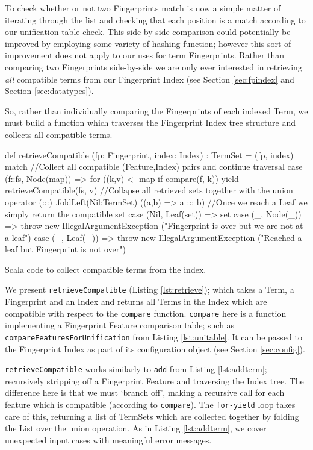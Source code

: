 To check whether or not two Fingerprints match is now a simple matter of iterating
through the list and checking that each position is a match according to our unification
table check. This side-by-side comparison could potentially be improved by employing
some variety of hashing function; however this sort of improvement does not
apply to our uses for term Fingerprints. Rather than comparing two Fingerprints
side-by-side we are only ever interested in retrieving \emph{all} compatible
terms from our Fingerprint Index (see Section \ref{sec:fpindex}
and Section \ref{sec:datatypes}).

So, rather than individually comparing the Fingerprints of each indexed Term,
we must build a function which traverses the Fingerprint Index tree structure
and collects all compatible terms.

\begin{listing}[H]
\begin{scalacode}
def retrieveCompatible (fp: Fingerprint, index: Index) : TermSet =
(fp, index) match {
//Collect all compatible (Feature,Index) pairs and continue traversal
    case (f::fs, Node(map)) => 
        {for ((k,v) <- map if compare(f, k))
            yield retrieveCompatible(fs, v)}
//Collapse all retrieved sets together with the union operator (:::)
        .foldLeft(Nil:TermSet) ((a,b) => a ::: b)
//Once we reach a Leaf we simply return the compatible set 
    case (Nil, Leaf(set)) => set
    case (_, Node(_)) => throw new IllegalArgumentException
         ("Fingerprint is over but we are not at a leaf")
    case (_, Leaf(_)) => throw new IllegalArgumentException
         ("Reached a leaf but Fingerprint is not over")
}
\end{scalacode}
\caption{Scala code to collect compatible terms from the index.}
\label{lst:retrieve}
\end{listing}

We present \verb!retrieveCompatible! (Listing \ref{lst:retrieve}); which takes
a Term, a Fingerprint and an Index and returns all Terms in the Index which
are compatible with respect to the \verb!compare! function.
\verb!compare! here is a function implementing a Fingerprint Feature comparison
table; such as \verb!compareFeaturesForUnification! from Listing \ref{lst:unitable}.
It can be passed to the Fingerprint Index as part of its configuration
object (see Section \ref{sec:config}).

\verb!retrieveCompatible! works similarly to \verb!add! from Listing \ref{lst:addterm};
recursively stripping off a Fingerprint Feature and traversing the Index tree.
The difference here is that we must `branch off', making a recursive call for
each feature which is compatible (according to \verb!compare!). The \verb!for-yield!
loop takes care of this, returning a list of TermSets which are collected together
by folding the List over the union operation. As in Listing \ref{lst:addterm}, we cover
unexpected input cases with meaningful error messages.


